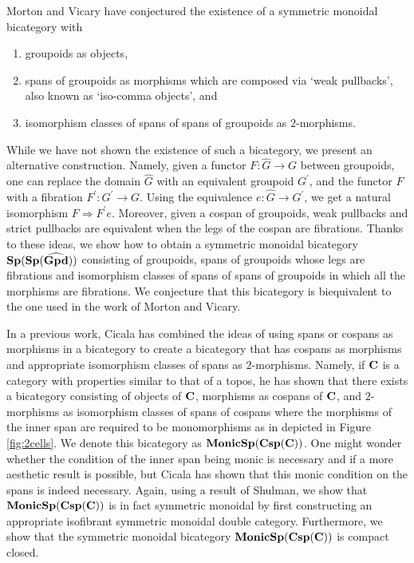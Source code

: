 \documentclass[11pt]{amsart}
\theoremstyle{remark}
\theoremstyle{definition}
\begin{document}
Morton and Vicary \cite{MortVic} have conjectured the existence of a symmetric monoidal bicategory with
\begin{enumerate}
\item{groupoids as objects,}
\item{spans of groupoids as morphisms which are composed via `weak pullbacks', also known as `iso-comma objects', and}
\item{isomorphism classes of spans of spans of groupoids as $2$-morphisms.}
\end{enumerate}
While we have not shown the existence of such a bicategory, we present an alternative construction. Namely, given a functor $F \colon \widehat{G} \to G$ between groupoids, one can replace the domain $\widehat{G}$ with an equivalent groupoid $G^\prime$, and the functor $F$ with a fibration $F^\prime \colon G^\prime \to G$. Using the equivalence $e \colon \widehat{G} \to G^\prime$, we get a natural isomorphism $F \Rightarrow F^\prime e$. Moreover, given a cospan of groupoids, weak pullbacks and strict pullbacks are equivalent when the legs of the cospan are fibrations. Thanks to these ideas, we show how to obtain a symmetric monoidal bicategory $\bold{Sp(Sp(\widehat{Gpd}))}$ consisting of groupoids, spans of groupoids whose legs are fibrations and isomorphism classes of spans of spans of groupoids in which all the morphisms are fibrations. We conjecture that this bicategory is biequivalent to the one used in the work of Morton and Vicary.

In a previous work, Cicala \cite{Cic} has combined the ideas of using spans or cospans as morphisms in a bicategory to create a bicategory that has cospans as morphisms and appropriate isomorphism classes of spans as $2$-morphisms. Namely, if $\bold{C}$ is a category with properties similar to that of a topos, he has shown that there exists a bicategory consisting of objects of $\bold{C}$, morphisms as cospans of $\bold{C}$, and $2$-morphisms as isomorphism classes of spans of cospans where the morphisms of the inner span are required to be monomorphisms as in depicted in Figure \ref{fig:2cells}. We denote this bicategory as $\bold{MonicSp(Csp(C))}$. One might wonder whether the condition of the inner span being monic is necessary and if a more aesthetic result is possible, but Cicala has shown that this monic condition on the spans is indeed necessary. Again, using a result of Shulman, we show that $\bold{MonicSp(Csp(C))}$ is in fact symmetric monoidal by first constructing an appropriate isofibrant symmetric monoidal double category. Furthermore, we show that the symmetric monoidal bicategory $\bold{MonicSp(Csp(C))}$ is compact closed.
\end{document}
